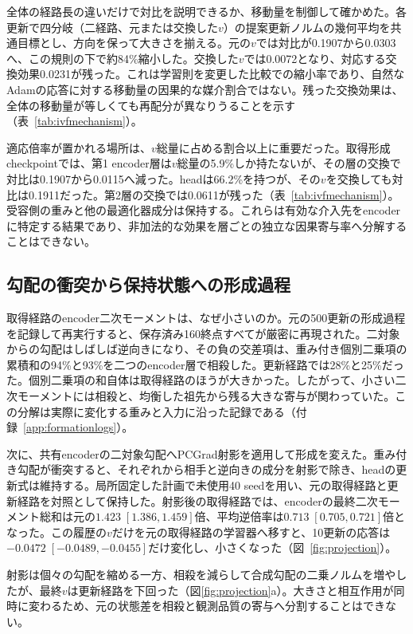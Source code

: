 全体の経路長の違いだけで対比を説明できるか、移動量を制御して確かめた。各更新で四分岐（二経路、元または交換した$v$）の提案更新ノルムの幾何平均を共通目標とし、方向を保って大きさを揃える。元の$v$では対比が0.1907から0.0303へ、この規則の下で約84\%縮小した。交換した$v$では0.0072となり、対応する交換効果0.0231が残った。これは学習則を変更した比較での縮小率であり、自然なAdamの応答に対する移動量の因果的な媒介割合ではない。残った交換効果は、全体の移動量が等しくても再配分が異なりうることを示す（表~\ref{tab:ivfmechanism}）。

適応倍率が置かれる場所は、$v$総量に占める割合以上に重要だった。取得形成checkpointでは、第1 encoder層は$v$総量の5.9\%しか持たないが、その層の交換で対比は0.1907から0.0115へ減った。headは66.2\%を持つが、その$v$を交換しても対比は0.1911だった。第2層の交換では0.0611が残った（表~\ref{tab:ivfmechanism}）。受容側の重みと他の最適化器成分は保持する。これらは有効な介入先をencoderに特定する結果であり、非加法的な効果を層ごとの独立な因果寄与率へ分解することはできない。

\subsection{勾配の衝突から保持状態への形成過程}
\label{sec:forming}
取得経路のencoder二次モーメントは、なぜ小さいのか。元の500更新の形成過程を記録して再実行すると、保存済み160終点すべてが厳密に再現された。二対象からの勾配はしばしば逆向きになり、その負の交差項は、重み付き個別二乗項の累積和の94\%と93\%を二つのencoder層で相殺した。更新経路では28\%と25\%だった。個別二乗項の和自体は取得経路のほうが大きかった。したがって、小さい二次モーメントには相殺と、均衡した祖先から残る大きな寄与が関わっていた。この分解は実際に変化する重みと入力に沿った記録である（付録~\ref{app:formationlogs}）。

次に、共有encoderの二対象勾配へPCGrad射影を適用して形成を変えた\citep{yu2020gradient}。重み付き勾配が衝突すると、それぞれから相手と逆向きの成分を射影で除き、headの更新式は維持する。局所固定した計画で未使用40 seedを用い、元の取得経路と更新経路を対照として保持した。射影後の取得経路では、encoderの最終二次モーメント総和は元の$1.423\;[1.386,1.459]$倍、平均逆倍率は$0.713\;[0.705,0.721]$倍となった。この履歴の$v$だけを元の取得経路の学習器へ移すと、10更新の応答は$-0.0472\;[-0.0489,-0.0455]$だけ変化し、小さくなった（図~\ref{fig:projection}）。

射影は個々の勾配を縮める一方、相殺を減らして合成勾配の二乗ノルムを増やしたが、最終$v$は更新経路を下回った（図\ref{fig:projection}a）。大きさと相互作用が同時に変わるため、元の状態差を相殺と観測品質の寄与へ分割することはできない。

